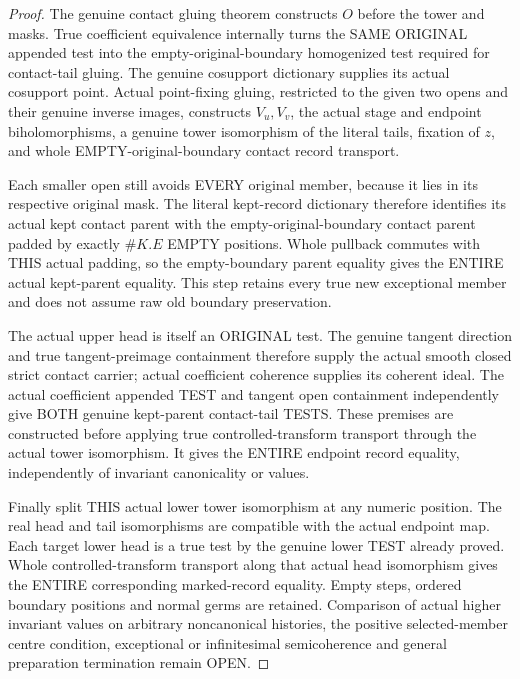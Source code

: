 \begin{proof}
The genuine contact gluing theorem constructs $O$ before the tower and
masks. True coefficient equivalence internally turns the SAME ORIGINAL
appended test into the empty-original-boundary homogenized test required
for contact-tail gluing. The genuine cosupport dictionary supplies its
actual cosupport point. Actual point-fixing gluing, restricted to the
given two opens and their genuine inverse images, constructs $V_u,V_v$,
the actual stage and endpoint biholomorphisms, a genuine tower isomorphism
of the literal tails, fixation of $z$, and whole EMPTY-original-boundary
contact record transport.

Each smaller open still avoids EVERY original member, because it lies in
its respective original mask. The literal kept-record dictionary therefore
identifies its actual kept contact parent with the empty-original-boundary
contact parent padded by exactly $\#K.E$ EMPTY positions. Whole pullback
commutes with THIS actual padding, so the empty-boundary parent equality
gives the ENTIRE actual kept-parent equality. This step retains every true
new exceptional member and does not assume raw old boundary preservation.

The actual upper head is itself an ORIGINAL test. The genuine tangent
direction and true tangent-preimage containment therefore supply the actual
smooth closed strict contact carrier; actual coefficient coherence supplies
its coherent ideal. The actual coefficient appended TEST and tangent open
containment independently give BOTH genuine kept-parent contact-tail TESTS.
These premises are constructed before applying true controlled-transform
transport through the actual tower isomorphism. It gives the ENTIRE endpoint
record equality, independently of invariant canonicality or values.

Finally split THIS actual lower tower isomorphism at any numeric position.
The real head and tail isomorphisms are compatible with the actual endpoint
map. Each target lower head is a true test by the genuine lower TEST already
proved. Whole controlled-transform transport along that actual head
isomorphism gives the ENTIRE corresponding marked-record equality. Empty
steps, ordered boundary positions and normal germs are retained. Comparison
of actual higher invariant values on arbitrary noncanonical histories,
the positive selected-member centre condition, exceptional or infinitesimal
semicoherence and general preparation termination remain OPEN.
\end{proof}
